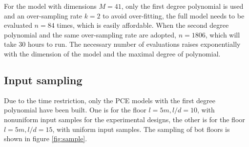 For the model with dimensions $M=41$, only the first degree polynomial is used and an over-sampling rate $k=2$ to avoid over-fitting, the full model needs to be evaluated $n=84$ times, which is easily affordable. When the second degree polynomial and the same over-sampling rate are adopted, $n=1806$, which will take 30 hours to run. The necessary number of evaluations raises exponentially with the dimension of the model and the maximal degree of polynomial. 

\subsection{Input sampling}
Due to the time restriction, only the PCE models with the first degree polynomial have been built. One is for the floor $l=5m, l/d=10$, with nonuniform input samples for the experimental designs, the other is for the floor $l=5m, l/d=15$, with uniform input samples. The sampling of bot floors is shown in figure \ref{fig:sample}. 

